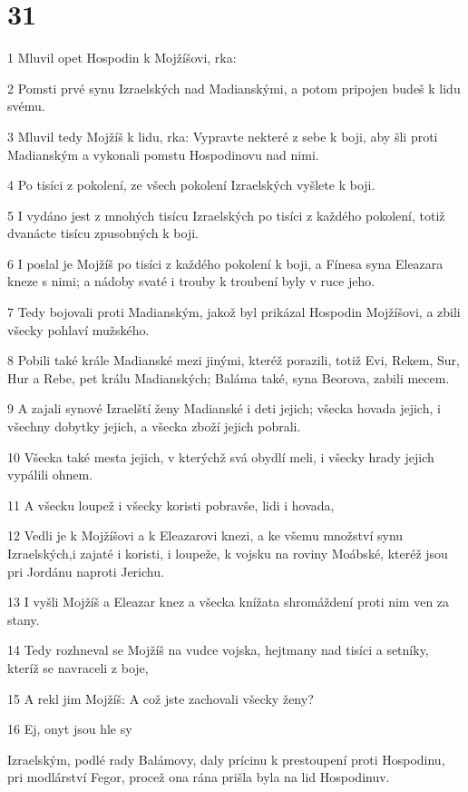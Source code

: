 \chapter{31}

\par 1 Mluvil opet Hospodin k Mojžíšovi, rka:
\par 2 Pomsti prvé synu Izraelských nad Madianskými, a potom pripojen budeš k lidu svému.
\par 3 Mluvil tedy Mojžíš k lidu, rka: Vypravte nekteré z sebe k boji, aby šli proti Madianským a vykonali pomstu Hospodinovu nad nimi.
\par 4 Po tisíci z pokolení, ze všech pokolení Izraelských vyšlete k boji.
\par 5 I vydáno jest z mnohých tisícu Izraelských po tisíci z každého pokolení, totiž dvanácte tisícu zpusobných k boji.
\par 6 I poslal je Mojžíš po tisíci z každého pokolení k boji, a Fínesa syna Eleazara kneze s nimi; a nádoby svaté i trouby k troubení byly v ruce jeho.
\par 7 Tedy bojovali proti Madianským, jakož byl prikázal Hospodin Mojžíšovi, a zbili všecky pohlaví mužského.
\par 8 Pobili také krále Madianské mezi jinými, kteréž porazili, totiž Evi, Rekem, Sur, Hur a Rebe, pet králu Madianských; Baláma také, syna Beorova, zabili mecem.
\par 9 A zajali synové Izraelští ženy Madianské i deti jejich; všecka hovada jejich, i všechny dobytky jejich, a všecka zboží jejich pobrali.
\par 10 Všecka také mesta jejich, v kterýchž svá obydlí meli, i všecky hrady jejich vypálili ohnem.
\par 11 A všecku loupež i všecky koristi pobravše, lidi i hovada,
\par 12 Vedli je k Mojžíšovi a k Eleazarovi knezi, a ke všemu množství synu Izraelských,i zajaté i koristi, i loupeže, k vojsku na roviny Moábské, kteréž jsou pri Jordánu naproti Jerichu.
\par 13 I vyšli Mojžíš a Eleazar knez a všecka knížata shromáždení proti nim ven za stany.
\par 14 Tedy rozhneval se Mojžíš na vudce vojska, hejtmany nad tisíci a setníky, kteríž se navraceli z boje,
\par 15 A rekl jim Mojžíš: A což jste zachovali všecky ženy?
\par 16 Ej, onyt jsou hle sy\par Izraelským, podlé rady Balámovy, daly prícinu k prestoupení proti Hospodinu, pri modlárství Fegor, procež ona rána prišla byla na lid Hospodinuv.
